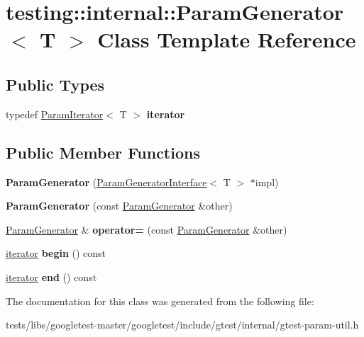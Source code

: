\hypertarget{classtesting_1_1internal_1_1ParamGenerator}{}\section{testing\+:\+:internal\+:\+:Param\+Generator$<$ T $>$ Class Template Reference}
\label{classtesting_1_1internal_1_1ParamGenerator}
\subsection*{Public Types}
\begin{DoxyCompactItemize}
\item 
\mbox{\label{classtesting_1_1internal_1_1ParamGenerator_a448b08a8eaae1f1d27840d4dbd66c357}} 
typedef \hyperlink{classtesting_1_1internal_1_1ParamIterator}{Param\+Iterator}$<$ T $>$ {\bfseries iterator}
\end{DoxyCompactItemize}
\subsection*{Public Member Functions}
\begin{DoxyCompactItemize}
\item 
\mbox{\label{classtesting_1_1internal_1_1ParamGenerator_a6b017d4d030927714d495ee95ae92fbc}} 
{\bfseries Param\+Generator} (\hyperlink{classtesting_1_1internal_1_1ParamGeneratorInterface}{Param\+Generator\+Interface}$<$ T $>$ $\ast$impl)
\item 
\mbox{\label{classtesting_1_1internal_1_1ParamGenerator_a5891d25c31919b3099489f8bbcd58b5e}} 
{\bfseries Param\+Generator} (const \hyperlink{classtesting_1_1internal_1_1ParamGenerator}{Param\+Generator} \&other)
\item 
\mbox{\label{classtesting_1_1internal_1_1ParamGenerator_a590a03c6e0a3a3ac6279943ad1f01dc8}} 
\hyperlink{classtesting_1_1internal_1_1ParamGenerator}{Param\+Generator} \& {\bfseries operator=} (const \hyperlink{classtesting_1_1internal_1_1ParamGenerator}{Param\+Generator} \&other)
\item 
\mbox{\label{classtesting_1_1internal_1_1ParamGenerator_a14e735c8bd113556ae905a560cd2d607}} 
\hyperlink{classtesting_1_1internal_1_1ParamIterator}{iterator} {\bfseries begin} () const
\item 
\mbox{\label{classtesting_1_1internal_1_1ParamGenerator_aaf8f75df1099a07ff771a550b48f9fbe}} 
\hyperlink{classtesting_1_1internal_1_1ParamIterator}{iterator} {\bfseries end} () const
\end{DoxyCompactItemize}


The documentation for this class was generated from the following file\+:\begin{DoxyCompactItemize}
\item 
tests/libs/googletest-\/master/googletest/include/gtest/internal/gtest-\/param-\/util.\+h\end{DoxyCompactItemize}
